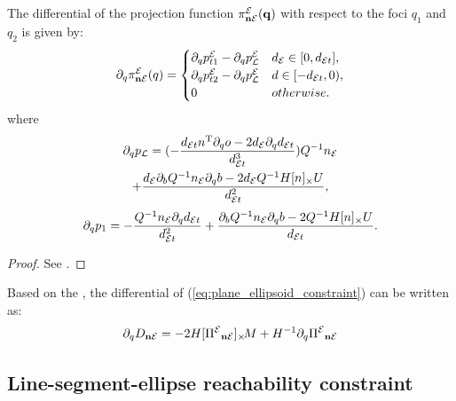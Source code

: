 \documentclass[journal]{IEEEtran}  %
\begin{document}
  \begin{proposition}\label{prop:dpi_ne_dt}
    The differential of the projection function $\pi^{\mathcal{E}}_{\mathbf{n} \mathcal{E}}(\mathbf{q})$ with respect to the foci $q_1$ and $q_2$ is given by:
    \begin{equation}
      \partial_q \pi^{\mathcal{E}}_{\mathbf{n} \mathcal{E}}(q) = \begin{cases}
        \partial_q p^{\mathcal{E}}_{t1}-\partial_q p^{\mathcal{E}}_{\mathcal{L}} &  d_{\mathcal{E}} \in [0, d_{\mathcal{E} t}], \\
        \partial_q p^{\mathcal{E}}_{t2}-\partial_q p^{\mathcal{E}}_{\mathcal{L}} &  d \in [- d_{\mathcal{E} t},0), \\
        {0} & otherwise.
      \end{cases}
    \end{equation}
    where
    \begin{multline}
      \partial_q p_{\mathcal{L}} =   (-\frac{d_{\mathcal{E} t} n^\mathrm{T} \partial_q o -2d_{\mathcal{E}} \partial_q d_{\mathcal{E} t}}{d_{\mathcal{E} t}^3} )Q^{-1}n_{\mathcal{E}} \\
      + \frac{d_{\mathcal{E}}\partial_b Q^{-1} n_{\mathcal{E}} \partial_q b -  2d_{\mathcal{E}} Q^{-1}H[n]_\times U}{d_{\mathcal{E} t}^2},
    \end{multline}
    \begin{equation}
      \partial_q p_{1} =  -\frac{Q^{-1}n_{\mathcal{E}} \partial_q d_{\mathcal{E} t} }{d_{\mathcal{E} t}^2} 
      + \frac{\partial_b Q^{-1}n_{\mathcal{E}} \partial_q b -  2Q^{-1}H[n]_\times U }{d_{\mathcal{E} t}}.
    \end{equation}
  \end{proposition}
  \begin{proof}
  See .
  \end{proof}
  Based on the , the differential of (\ref{eq:plane_ellipsoid_constraint}) can be written as:
  \begin{equation}
    \partial_q {D_{\mathbf{n}\mathcal{E}}} = -2 H [{\Pi^{\mathcal{E}}}_{\mathbf{n} \mathcal{E}}]_{\times}\!  M + H^{-1}\partial_q {\Pi^{\mathcal{E}}}_{\mathbf{n} \mathcal{E}}
  \end{equation}

\subsection{Line-segment-ellipse reachability constraint}\label{chapter:ellipse to segment}
\end{document}
